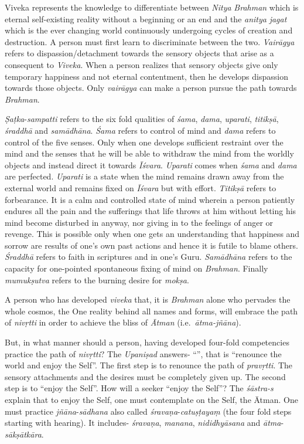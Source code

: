 Viveka represents the knowledge to differentiate between \emph{Nitya} \emph{Brahman} which is eternal self-existing reality without a beginning or an end and the \emph{anitya} \emph{jagat} which is the ever changing world continuously undergoing cycles of creation and destruction. A person must first learn to discriminate between the two. \emph{Vairāgya} refers to dispassion/detachment towards the sensory objects that arise as a consequent to \emph{Viveka}. When a person realizes that sensory objects give only temporary happiness and not eternal contentment, then he develops dispassion towards those objects. Only \emph{vairāgya} can make a person pursue the path towards \emph{Brahman}.
\vskip 1.1pt

\emph{Ṣaṭka}-\emph{sampatti} refers to the six fold qualities of \emph{śama}, \emph{dama}, \emph{uparati}, \emph{titikṣā}, \emph{śraddhā} and \emph{samādhāna}. \emph{Śama} refers to control of mind and \emph{dama} refers to control of the five senses. Only when one develops sufficient restraint over the mind and the senses that he will be able to withdraw the mind from the worldly objects and instead direct it towards \emph{Īśvara}. \emph{Uparati} comes when \emph{śama} and \emph{dama} are perfected. \emph{Uparati} is a state when the mind remains drawn away from the external world and remains fixed on \emph{Īśvara} but with effort. \emph{Titikṣā} refers to forbearance. It is a calm and controlled state of mind wherein a person patiently endures all the pain and the sufferings that life throws at him without letting his mind become disturbed in anyway, nor giving in to the feelings of anger or revenge. This is possible only when one gets an understanding that happiness and sorrow are results of one's own past actions and hence it is futile to blame others. \emph{Śraddhā} refers to faith in scriptures and in one's Guru. \emph{Samādhāna} refers to the capacity for one-pointed spontaneous fixing of mind on \emph{Brahman}. Finally \emph{mumukṣutva} refers to the burning desire for \emph{mokṣa}.
\vskip 1.1pt

A person who has developed \emph{viveka} that, it is \emph{Brahman} alone who pervades the whole cosmos, the One reality behind all names and forms, will embrace the path of \emph{nivṛtti} in order to achieve the bliss of \emph{Ātman} (i.e.\ \emph{ātma-jñāna}).
\vskip 1.1pt

But, in what manner should a person, having developed four-fold competencies practice the path of \emph{nivṛtti}? The \emph{Upaniṣad} answers- ``'', that is ``renounce the world and enjoy the Self''. The first step is to renounce the path of \emph{pravṛtti}. The sensory attachments and the desires must be completely given up. The second step is to ``enjoy the Self''. How will a seeker ``enjoy the Self''? The \emph{śāstra-s} explain that to enjoy the Self, one must contemplate on the Self, the Ātman. One must practice \emph{jñāna}-\emph{sādhana} also called \emph{śravaṇa}-\emph{catuṣṭayaṃ} (the four fold steps starting with hearing). It includes- \emph{śravaṇa}, \emph{manana}, \emph{nididhyāsana} and \emph{ātma}-\emph{sākṣātkāra}.
\vskip 1.1pt

